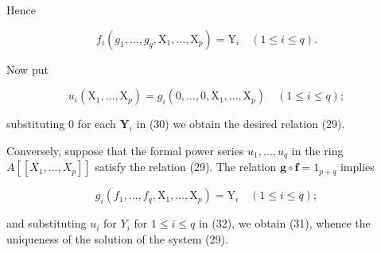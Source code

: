 Hence

\[
f _ {i} \left(g _ {1}, \dots , g _ {q}, \mathrm{X} _ {1}, \dots , \mathrm{X} _ {p}\right) = \mathrm{Y} _ {i} \quad (1 \leqslant i \leqslant q).\tag{30}
\]

Now put

\[
u _ {i} \left(\mathrm{X} _ {1}, \dots , \mathrm{X} _ {p}\right) = g _ {i} (0, \dots , 0, \mathrm{X} _ {1}, \dots , \mathrm{X} _ {p}) \quad (1 \leqslant i \leqslant q);\tag{31}
\]

substituting 0 for each \(\mathbf{Y}_i\) in (30) we obtain the desired relation (29).

Conversely, suppose that the formal power series \(u_1, \ldots, u_q\) in the ring \(A[[X_1, \ldots, X_p]]\) satisfy the relation (29). The relation \(\mathbf{g} \circ \mathbf{f} = 1_{p + q}\) implies

\[
g _ {i} (f _ {1}, \dots , f _ {q}, \mathrm{X} _ {1}, \dots , \mathrm{X} _ {p}) = \mathrm{Y} _ {i} \quad (1 \leqslant i \leqslant q);\tag{32}
\]

and substituting \(u_{i}\) for \(Y_{i}\) for \(1 \leqslant i \leqslant q\) in (32), we obtain (31), whence the uniqueness of the solution of the system (29).

